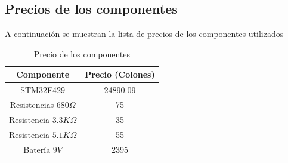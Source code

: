 \newpage
\subsection{Precios de los componentes}

A continuación se muestran la lista de precios de los componentes utilizados



\begin{table}[h]
\centering
\begin{tabular}{|c|c|}
\hline
\textbf{Componente} & \textbf{Precio (Colones)} \\ \hline
    STM32F429   &  24890.09                   \\ \hline
    Resistencias $680 \Omega$   &  75                   \\ \hline
    Resistencia $3.3 K\Omega$   &  35                   \\ \hline
    Resistencia $5.1 K\Omega$   &  55                   \\ \hline
    Batería $9 V$   &  2395                   \\ \hline
    
    

\end{tabular}
\caption{Precio de los componentes}
\label{tab:my-table}
\end{table}